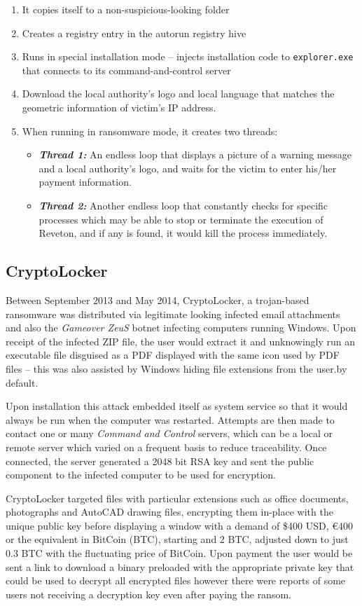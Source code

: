 \documentclass[10pt,a4paper]{article}
\begin{document}
\begin{enumerate}
\item It copies itself to a non-suspicious-looking folder
\item Creates a registry entry in the autorun registry hive
\item Runs in special installation mode – injects installation code to \texttt{explorer.exe} that connects to its command-and-control server
\item Download the local authority’s logo and local language that matches the geometric information of victim’s IP address.
\item When running in ransomware mode, it creates two threads:
\begin{itemize}
\item \textbf{\textit{Thread 1: }}An endless loop that displays a picture of a warning message and a local authority’s logo, and waits for the victim to enter his/her payment information.
\item \textbf{\textit{Thread 2: }}Another endless loop that constantly checks for specific processes which may be able to stop or terminate the execution of Reveton, and if any is found, it would kill the process immediately.
\end{itemize}
\end{enumerate}

\subsection{CryptoLocker}
Between September 2013 and May 2014, CryptoLocker, a trojan-based ransomware was distributed via legitimate looking infected email attachments and also the \textit{Gameover ZeuS} botnet infecting computers running Windows. Upon receipt of the infected ZIP file, the user would extract it and unknowingly run an executable file disguised as a PDF displayed with the same icon used by PDF files -- this was also assisted by Windows hiding file extensions from the user.by default.

Upon installation this attack embedded itself as system service so that it would always be run when the computer was restarted. Attempts are then made to contact one or many \textit{Command and Control} servers, which can be a local or remote server which varied on a frequent basis to reduce traceability. Once connected, the server generated a 2048 bit RSA key and sent the public component to the infected computer to be used for encryption.

CryptoLocker targeted files with particular extensions such as office documents, photographs and AutoCAD drawing files, encrypting them in-place with the unique public key before displaying a window with a demand of \$400 USD, \euro400 or the equivalent in BitCoin (BTC), starting and 2 BTC, adjusted down to just 0.3 BTC with the fluctuating price of BitCoin. Upon payment the user would be sent a link to download a binary preloaded with the appropriate private key that could be used to decrypt all encrypted files however there were reports of some users not receiving a decryption key even after paying the ransom.
\end{document}
